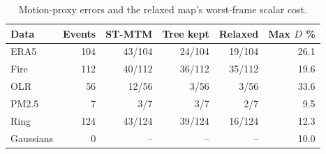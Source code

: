 \begin{table}[t]
\caption{Motion-proxy errors and the relaxed map's worst-frame scalar cost.}\label{tab:motion}
\centering\footnotesize
\setlength{\tabcolsep}{3pt}
\begin{tabular}{lrrrrr}\toprule
Data & Events & ST-MTM & Tree kept & Relaxed & Max $D$ \%\\\midrule
ERA5 & 104 & 43/104 & 24/104 & 19/104 & 26.1\\
Fire & 112 & 40/112 & 36/112 & 35/112 & 19.6\\
OLR & 56 & 12/56 & 3/56 & 3/56 & 33.6\\
PM2.5 & 7 & 3/7 & 3/7 & 2/7 & 9.5\\
Ring & 124 & 43/124 & 39/124 & 16/124 & 12.3\\
Gaussians & 0 & -- & -- & -- & 10.0\\
\bottomrule\end{tabular}
\par{}
\end{table}
